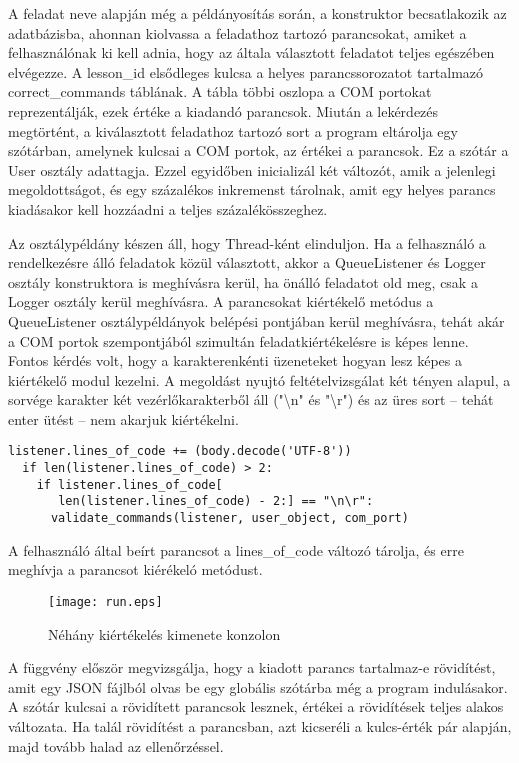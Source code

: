 \documentclass[12pt]{report}
\begin{document}
A feladat neve alapján még a példányosítás során, a konstruktor becsatlakozik az adatbázisba, ahonnan kiolvassa a feladathoz tartozó parancsokat, amiket a felhasználónak ki kell adnia, hogy az általa választott feladatot teljes egészében elvégezze.
A lesson\_id elsődleges kulcsa a helyes parancssorozatot tartalmazó correct\_commands táblának. A tábla többi oszlopa a COM portokat reprezentálják, ezek értéke a kiadandó parancsok.
Miután a lekérdezés megtörtént, a kiválasztott feladathoz tartozó sort a program eltárolja egy szótárban, amelynek kulcsai a COM portok, az értékei a parancsok. Ez a szótár a User osztály adattagja.
Ezzel egyidőben inicializál két változót, amik a jelenlegi megoldottságot, és egy százalékos inkremenst tárolnak, amit egy helyes parancs kiadásakor kell hozzáadni a teljes százalékösszeghez.


Az osztálypéldány készen áll, hogy Thread-ként elinduljon. Ha a felhasználó a rendelkezésre álló feladatok közül választott, akkor a QueueListener és Logger osztály konstruktora is meghívásra kerül, ha önálló feladatot old meg, csak a Logger osztály kerül meghívásra.
A parancsokat kiértékelő metódus a QueueListener osztálypéldányok belépési pontjában kerül meghívásra, tehát akár a COM portok szempontjából szimultán feladatkiértékelésre is képes lenne.
Fontos kérdés volt, hogy a karakterenkénti üzeneteket hogyan lesz képes a kiértékelő modul kezelni. A megoldást nyujtó feltételvizsgálat két tényen alapul, a sorvége karakter két vezérlőkarakterből áll ("\textbackslash n" és "\textbackslash r") és az üres sort -- tehát enter ütést -- nem akarjuk kiértékelni.

\begin{verbatim}
listener.lines_of_code += (body.decode('UTF-8'))
  if len(listener.lines_of_code) > 2:
    if listener.lines_of_code[
       len(listener.lines_of_code) - 2:] == "\n\r":
      validate_commands(listener, user_object, com_port)
\end{verbatim}

A felhasználó által beírt parancsot a lines\_of\_code változó tárolja, és erre meghívja a parancsot kiérékeló metódust.

\begin{figure}[h]
    \centering
    \texttt{[image: run.eps]}
    \caption{Néhány kiértékelés kimenete konzolon}
\end{figure}

\newpage

A függvény először megvizsgálja, hogy a kiadott parancs tartalmaz-e rövidítést, amit egy JSON fájlból olvas be egy globális szótárba még a program indulásakor. A szótár kulcsai a rövidített parancsok lesznek, értékei a rövidítések teljes alakos változata. Ha talál rövidítést a parancsban, azt kicseréli a kulcs-érték pár alapján, majd tovább halad az ellenőrzéssel.
\end{document}
